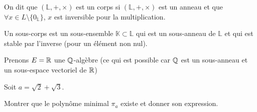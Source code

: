 \documentclass[11pt,a4paper]{report}
\begin{document}
\begin{rappel}
    On dit que $(\mathbb{L}, +, \times)$ est un corps si $(\mathbb L, +, \times)$ est un anneau et que $\forall x \in L\setminus \{0_\mathbb{L}\}$, $x$ est inversible pour la multiplication.

    Un sous-corps est un sous-ensemble $\mathbb{K} \subset \mathbb{L}$ qui est un sous-anneau de $\mathbb{L}$ et qui est stable par l'inverse (pour un élément non nul).
\end{rappel}

\begin{exercise}
    \label{exo:polynome-minimal-racines-carrees}
    Prenons $E = \mathbb{R}$ une $\mathbb{Q}$-algèbre (ce qui est possible car $\mathbb{Q}$ est un sous-anneau et un sous-espace vectoriel de $\mathbb{R}$)

    Soit $a = \sqrt 2 + \sqrt 3$.

    Montrer que le polynôme minimal $\pi_a$ existe et donner son expression.
\end{exercise}
\end{document}
